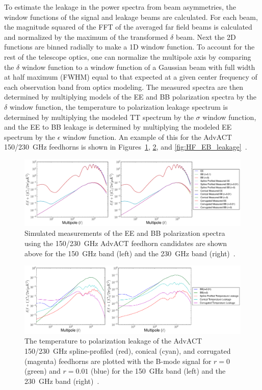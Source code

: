 To estimate the leakage in the power spectra from beam asymmetries, the window functions of the signal and leakage beams are calculated. For each beam, the magnitude squared of the FFT of the averaged far field beams is calculated and normalized by the maximum of the transformed $\delta$ beam. Next the 2D functions are binned radially to make a 1D window function.  To account for the rest of the telescope optics, one can normalize the multipole axis by comparing the $\delta$ window function to a window function of a Gaussian beam with full width at half maximum (FWHM) equal to that expected at a given center frequency of each observation band from optics modeling. The measured spectra are then determined by multiplying models of the EE and BB polarization spectra by the $\delta$ window function, the temperature to polarization leakage spectrum is determined by multiplying the modeled TT spectrum by the $\sigma$ window function, and the EE to BB leakage is determined by multiplying the modeled EE spectrum by the $\epsilon$ window function. An example of this for the AdvACT 150/230~GHz feedhorns is shown in Figures~\ref{fig:HF_measured_spectra}, \ref{fig:HF_TP_leakage}, and \ref{fig:HF_EB_leakage}~\cite{Simon_Thesis_2016}.

\begin{figure}[h!]
\centering
\includegraphics[width=\textwidth]{figures/HF_measured_spectra.pdf}
\caption{Simulated measurements of the EE and BB polarization spectra using the 150/230~GHz AdvACT feedhorn candidates are shown above for the 150~GHz band (left) and the 230~GHz band (right)~\cite{Simon_Thesis_2016}.}
\label{fig:HF_measured_spectra}
\end{figure}

\begin{figure}[h!]
\centering
\includegraphics[width=\textwidth]{figures/HF_TP_leakage.pdf}
\caption{The temperature to polarization leakage of the AdvACT 150/230~GHz spline-profiled (red), conical (cyan), and corrugated (magenta) feedhorns are plotted with the B-mode signal for $r=0$ (green) and $r=0.01$ (blue) for the 150~GHz band (left) and the 230~GHz band (right)~\cite{Simon_Thesis_2016}.}
\label{fig:HF_TP_leakage}
\end{figure}

